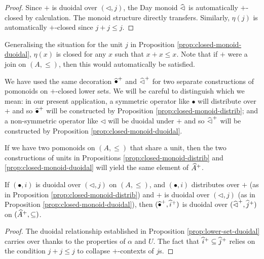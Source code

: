 \begin{proof}
  Since $+$ is duoidal over $(\lhd, j)$, the Day monoid $\mathop{\widehat{\lhd}}$
  is automatically $+$-closed by calculation. The monoid structure
  directly transfers. Similarly, $\eta(j)$ is automatically $+$-closed
  since $j + j \leq j$.
\end{proof}

\begin{remark}
  Generalising the situation for the unit $j$ in Proposition
  \ref{prop:closed-monoid-duoidal}, $\eta(x)$ is closed for any $x$
  such that $x + x \leq x$. Note that if $+$ were a join on
  $(A, \leq)$, then this would automatically be satisfied.
\end{remark}

\begin{remark}
  We have used the same decoration $\mathop{\widehat{\bullet}^+}$ and
  $\mathop{\widehat{\lhd}^+}$ for two separate constructions of pomonoids on
  $+$-closed lower sets. We will be careful to distinguish which we
  mean: in our present application, a symmetric operator like
  $\bullet$ will distribute over $+$ and so $\mathop{\widehat{\bullet}^+}$ will
  be constructed by Proposition \ref{prop:closed-monoid-distrib}; and
  a non-symmetric operator like $\lhd$ will be duoidal under $+$ and
  so $\mathop{\widehat{\lhd}^+}$ will be constructed by Proposition
  \ref{prop:closed-monoid-duoidal}.
\end{remark}

\begin{remark}
  If we have two pomonoids on $(A, \leq)$ that share a unit, then the
  two constructions of units in Propositions
  \ref{prop:closed-monoid-distrib} and
  \ref{prop:closed-monoid-duoidal} will yield the same element of
  $\widehat{A}^+$.
\end{remark}

\begin{proposition}
  If $(\bullet, i)$ is duoidal over $(\lhd, j)$ on $(A, \leq)$, and
  $(\bullet, i)$ distributes over $+$ (as in Proposition
  \ref{prop:closed-monoid-distrib}) and $+$ is duoidal over
  $(\lhd, j)$ (as in Proposition \ref{prop:closed-monoid-duoidal}),
  then $(\mathop{\widehat{\bullet}^+}, \mathop{\widehat{i}^+})$ is duoidal over
  $(\mathop{\widehat{\lhd}^+}, \mathop{\widehat{j}^+})$ on
  $(\widehat{A}^+, \subseteq)$.
\end{proposition}

\begin{proof}
  The duoidal relationship established in Proposition
  \ref{prop:lower-set-duoidal} carries over thanks to the properties
  of $\alpha$ and $U$. The fact that
  $\mathop{\widehat{i}^+} \subseteq \mathop{\widehat{j}^+}$ relies on the condition
  $j + j \leq j$ to collapse $+$-contexts of $j$s.
\end{proof}

